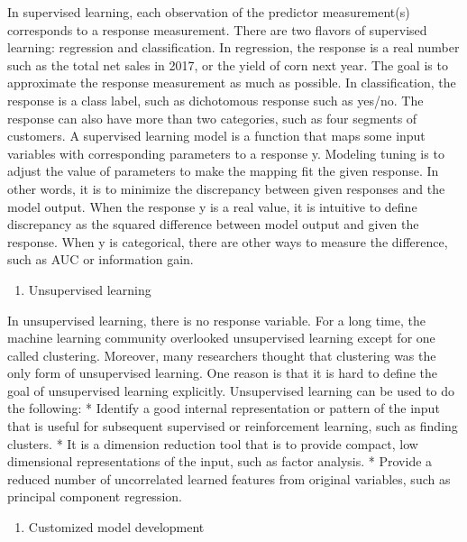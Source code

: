 \documentclass[12pt,]{krantz}
\providecommand{\tightlist}{%
  \setlength{\itemsep}{0pt}\setlength{\parskip}{0pt}}
\begin{document}
In supervised learning, each observation of the predictor measurement(s) corresponds to a response measurement. There are two flavors of supervised learning: regression and classification. In regression, the response is a real number such as the total net sales in 2017, or the yield of corn next year. The goal is to approximate the response measurement as much as possible. In classification, the response is a class label, such as dichotomous response such as yes/no. The response can also have more than two categories, such as four segments of customers. A supervised learning model is a function that maps some input variables with corresponding parameters to a response y. Modeling tuning is to adjust the value of parameters to make the mapping fit the given response. In other words, it is to minimize the discrepancy between given responses and the model output. When the response y is a real value, it is intuitive to define discrepancy as the squared difference between model output and given the response. When y is categorical, there are other ways to measure the difference, such as AUC or information gain.

\begin{enumerate}
\def\labelenumi{(\arabic{enumi})}
\setcounter{enumi}{1}
\tightlist
\item
  Unsupervised learning
\end{enumerate}

In unsupervised learning, there is no response variable. For a long time, the machine learning community overlooked unsupervised learning except for one called clustering. Moreover, many researchers thought that clustering was the only form of unsupervised learning. One reason is that it is hard to define the goal of unsupervised learning explicitly. Unsupervised learning can be used to do the following:
* Identify a good internal representation or pattern of the input that is useful for subsequent supervised or reinforcement learning, such as finding clusters.
* It is a dimension reduction tool that is to provide compact, low dimensional representations of the input, such as factor analysis.
* Provide a reduced number of uncorrelated learned features from original variables, such as principal component regression.

\begin{enumerate}
\def\labelenumi{(\arabic{enumi})}
\setcounter{enumi}{2}
\tightlist
\item
  Customized model development
\end{enumerate}
\end{document}
